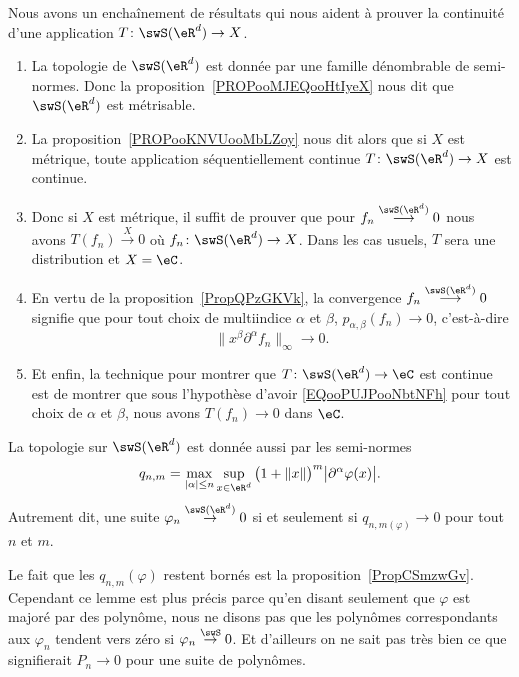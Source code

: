 \begin{normaltext}      \label{NORMooVQESooRwJShl}
Nous avons un enchaînement de résultats qui nous aident à prouver la continuité d'une application \( T\colon \swS(\eR^d)\to X\).
\begin{enumerate}
    \item
        La topologie de \( \swS(\eR^d)\) est donnée par une famille dénombrable de semi-normes. Donc la proposition~\ref{PROPooMJEQooHtIyeX} nous dit que \( \swS(\eR^d)\) est métrisable.
    \item
        La proposition~\ref{PROPooKNVUooMbLZoy} nous dit alors que si \( X\) est métrique, toute application séquentiellement continue \( T\colon \swS(\eR^d)\to X\) est continue.
    \item
        Donc si \( X\) est métrique, il suffit de prouver que pour \( f_n\stackrel{\swS(\eR^d)}{\longrightarrow}0\) nous avons \( T(f_n)\stackrel{X}{\longrightarrow} 0\) où \( f_n\colon \swS(\eR^d)\to X\). Dans les cas usuels, \( T\) sera une distribution et \( X=\eC\).
    \item
        En vertu de la proposition~\ref{PropQPzGKVk}, la convergence \( f_n\stackrel{\swS(\eR^d)}{\longrightarrow}0\) signifie que pour tout choix de multiindice \( \alpha\) et \( \beta\),  \( p_{\alpha,\beta}(f_n)\to 0\), c'est-à-dire
        \begin{equation}        \label{EQooPUJPooNbtNFh}
            \| x^{\beta}\partial^{\alpha}f_n \|_{\infty}\to 0.
        \end{equation}
    \item
        Et enfin, la technique pour montrer que \( T\colon \swS(\eR^d)\to \eC\) est continue est de montrer que sous l'hypothèse d'avoir \eqref{EQooPUJPooNbtNFh} pour tout choix de \( \alpha\) et \( \beta\), nous avons \( T(f_n)\to 0\) dans \( \eC\).
\end{enumerate}
\end{normaltext}

\begin{lemma}   \label{LemRJhCbkO}
    La topologie sur \( \swS(\eR^d)\) est donnée aussi par les semi-normes
    \begin{equation}
        q_{n,m}=\max_{| \alpha |\leq n}\sup_{x\in \eR^d}\big( 1+\| x \| \big)^m\big| \partial^{\alpha}\varphi(x) \big|.
    \end{equation}
    Autrement dit, une suite \( \varphi_n\stackrel{\swS(\eR^d)}{\to}0\) si et seulement si \( q_{n,m(\varphi)}\to 0\) pour tout \( n\) et \( m\).
\end{lemma}
Le fait que les \( q_{n,m}(\varphi)\) restent bornés est la proposition~\ref{PropCSmzwGv}. Cependant ce lemme est plus précis parce qu'en disant seulement que \( \varphi\) est majoré par des polynôme, nous ne disons pas que les polynômes correspondants aux \( \varphi_n\) tendent vers zéro si \( \varphi_n\stackrel{\swS}{\to}0\). Et d'ailleurs on ne sait pas très bien ce que signifierait \( P_n\to 0\) pour une suite de polynômes.

